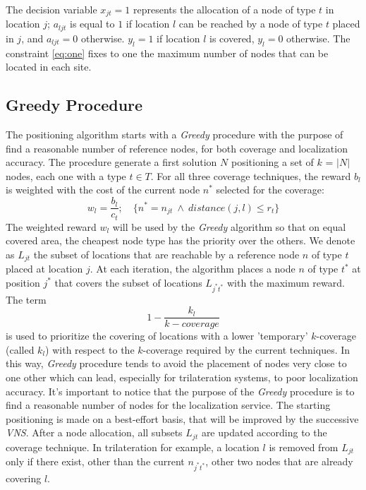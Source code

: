 The decision variable $x_{jt}=1$ represents the allocation of a node of type $t$ in location $j$; $a_{ljt}$ is equal to $1$ if location $l$ can be reached by a node of type $t$ placed in $j$, and $a_{ljt}=0$ otherwise. $y_l=1$ if location $l$ is covered, $y_l=0$ otherwise. The constraint \eqref{eq:one} fixes to one the maximum number of nodes that can be located in each site.

\subsection{Greedy Procedure}\label{subsec:greedy}
The positioning algorithm starts with a \emph{Greedy} procedure with the purpose of find a reasonable number of reference nodes, for both coverage and localization accuracy. The procedure generate a first solution \(N\) positioning a set of \(k\) = $\lvert N \rvert$ nodes, each one with a type \(t \in T\).
For all three coverage techniques, the reward $b_l$ is weighted with the cost of the current node $n^*$ selected for the coverage:
\begin{equation}\label{eq:w}
w_l = \frac{b_l}{ c_t}; \quad \{n^*=n_{jt} ~ \land ~ distance(j,l)  \leq r_t\}
\end{equation}
The weighted reward $w_l$ will be used by the \emph{Greedy} algorithm so that on equal covered area, the cheapest node type has the priority over the others.
We denote as \(L_{jt}\) the subset of locations that are reachable by a reference node \(n\) of type \(t\) placed at location \(j\). At each iteration, the algorithm places a node \(n\) of type \(t^*\) at position \(j^*\) that covers the subset of locations \(L_{j^*t^*}\) with the maximum reward. The term
\begin{equation}\label{eq:kcov}
1 - \frac{k_l}{k-coverage}
\end{equation}
is used to prioritize the covering of locations with a lower 'temporary' \mbox{$k$-coverage} (called $k_l$) with respect to the \mbox{$k$-coverage} required by the current techniques. In this way, \emph{Greedy} procedure tends to avoid the placement of nodes very close to one other which can lead, especially for trilateration systems, to poor localization accuracy.
It's important to notice that the purpose of the \emph{Greedy} procedure is to find a reasonable number of nodes for the localization service. The starting positioning is made on a best-effort basis, that will be improved by the successive \emph{VNS}.
After a node allocation, all subsets \(L_{jt}\) are updated according to the coverage technique. In trilateration for example, a location \(l\) is removed from \(L_{jt}\) only if there exist, other than the current  \(n_{j^*t^*}\), other two nodes that are already covering \(l\).

